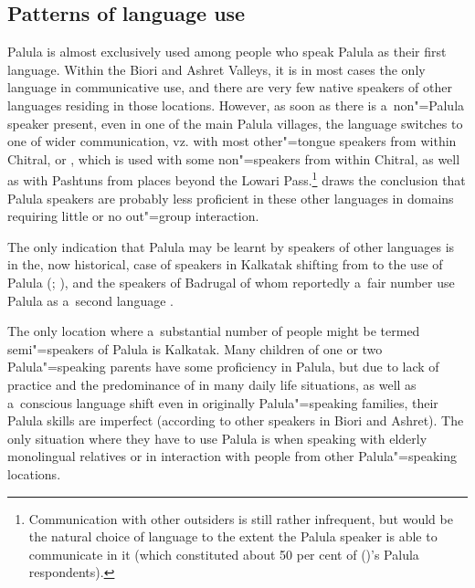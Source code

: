 \subsection{Patterns of language use}
\label{subsec:1-3-4}

Palula is almost exclusively used among people who speak Palula as their first language. Within the Biori and Ashret Valleys, it is in most cases the only language in communicative use, and there are very few native speakers of other languages residing in those locations. However, as soon as there is a~non"=Palula speaker present, even in one of the main Palula villages, the language switches to one of wider communication, vz. \iliKhowar with most other"=tongue speakers from within Chitral, or \iliPashto, which is used with some non"=\iliKhowar speakers from within Chitral, as well as with Pashtuns from places beyond the Lowari Pass.\footnote{Communication with other outsiders is still rather infrequent, but \iliUrdu would be the natural choice of language to the extent the Palula speaker is able to communicate in it (which constituted about 50 per cent of \citeauthor{decker1992a} (\citeyear{decker1992a})'s Palula respondents).} \citet{decker1992a} draws the conclusion that Palula speakers are probably less proficient in these other languages in domains requiring little or no out"=group interaction. 


The only indication that Palula may be learnt by speakers of other languages is in the, now historical, case of \iliKalasha speakers in Kalkatak shifting from \iliKalasha to the use of Palula (\citealt[55, 79]{decker1992b}; \citealt[5]{akhunzadaliljegren2009}), and the \iliShekhani speakers of Badrugal of whom reportedly a~fair number use Palula as a~second language \citep[59]{decker1992b}. 


The only location where a~substantial number of people might be termed semi"=speakers of Palula is Kalkatak. Many children of one or two Palula"=speaking parents have some proficiency in Palula, but due to lack of practice and the predominance of \iliKhowar in many daily life situations, as well as a~conscious language shift even in originally Palula"=speaking families, their Palula skills are imperfect (according to other speakers in Biori and Ashret). The only situation where they have to use Palula is when speaking with elderly monolingual relatives or in interaction with people from other Palula"=speaking locations.

